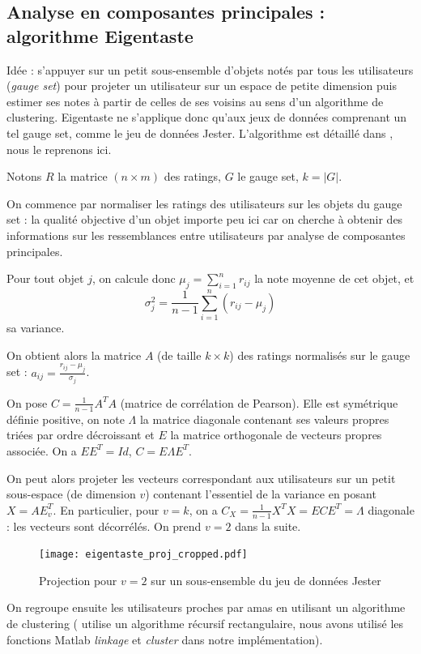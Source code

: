 \documentclass[11pt, openany, a4paper]{article}
\begin{document}
	\subsection{Analyse en composantes principales : algorithme Eigentaste}
		Idée : s'appuyer sur un petit sous-ensemble d'objets notés par tous les utilisateurs (\emph{gauge set}) pour projeter un utilisateur sur un espace de petite dimension puis estimer ses notes à partir de celles de ses voisins au sens d'un algorithme de clustering. Eigentaste ne s'applique donc qu'aux jeux de données comprenant un tel gauge set, comme le jeu de données Jester. L'algorithme est détaillé dans \cite{Goldberg2001}, nous le reprenons ici.
		
		Notons $R$ la matrice $(n\times m)$ des ratings, $G$ le gauge set, $k=|G|$.
		
		On commence par normaliser les ratings des utilisateurs sur les objets du gauge set : la qualité objective d'un objet importe peu ici car on cherche à obtenir des informations sur les ressemblances entre utilisateurs par analyse de composantes principales.
		
		Pour tout objet $j$, on calcule donc $\mu_j=\sum_{i=1}^n r_{ij}$ la note moyenne de cet objet, et $$\sigma_j^2 = \frac{1}{n-1} \sum_{i=1}^{n} (r_{ij} - \mu_j)$$ sa variance.
		
		On obtient alors la matrice $A$ (de taille $k\times k$) des ratings normalisés sur le gauge set : $a_{ij} = \frac{r_{ij}-\mu_j}{\sigma_j}$.
		
		On pose $C=\frac{1}{n-1} A^T A$ (matrice de corrélation de Pearson). Elle est symétrique définie positive, on note $\Lambda$ la matrice diagonale contenant ses valeurs propres triées par ordre décroissant et $E$ la matrice orthogonale de vecteurs propres associée. On a $EE^T = Id$, $C = E\Lambda E^T$.
		
		On peut alors projeter les vecteurs correspondant aux utilisateurs sur un petit sous-espace (de dimension $v$) contenant l'essentiel de la variance en posant $X=AE^T_v$. 
		En particulier, pour $v=k$, on a $C_X = \frac{1}{n-1} X^T X = ECE^T = \Lambda$ diagonale : les vecteurs sont décorrélés.
		On prend $v=2$ dans la suite.
		
			\begin{figure}[ht!]
				\centering
				\texttt{[image: eigentaste\_proj\_cropped.pdf]}
				\caption{Projection pour $v=2$ sur un sous-ensemble du jeu de données Jester}
			\end{figure}
			
		On regroupe ensuite les utilisateurs proches par amas en utilisant un algorithme de clustering (\cite{Goldberg2001} utilise un algorithme récursif rectangulaire, nous avons utilisé les fonctions Matlab \emph{linkage} et \emph{cluster} dans notre implémentation).
		
\end{document}
